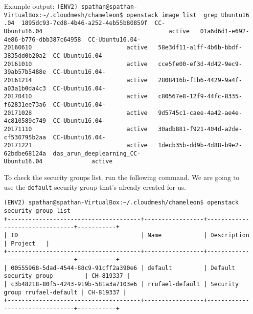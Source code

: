 Example output:
\texttt{(ENV2)\ spathan@spathan-VirtualBox:\textasciitilde{}/.cloudmesh/chameleon\$\ openstack\ image\ list\ \textbar{}\ grep\ \textquotesingle{}Ubuntu16.04\textquotesingle{}\ \textbar{}\ 1895dc93-7cd8-4b46-a252-4eb55b80859f\ \textbar{}\ CC-Ubuntu16.04\ \ \ \ \ \ \ \ \ \ \ \ \ \ \ \ \ \ \ \ \ \ \ \ \ \ \ \ \ \ \ \ \ \ \ \textbar{}\ active\ \textbar{}\ \textbar{}\ 01a6d6d1-e692-4e86-b776-dbb387c64958\ \textbar{}\ CC-Ubuntu16.04-20160610\ \ \ \ \ \ \ \ \ \ \ \ \ \ \ \ \ \ \ \ \ \ \ \ \ \ \textbar{}\ active\ \textbar{}\ \textbar{}\ 58e3df11-a1ff-4b6b-bbdf-3835dd0b20a2\ \textbar{}\ CC-Ubuntu16.04-20161010\ \ \ \ \ \ \ \ \ \ \ \ \ \ \ \ \ \ \ \ \ \ \ \ \ \ \textbar{}\ active\ \textbar{}\ \textbar{}\ cce5fe00-ef3d-4d42-9ec9-39ab57b5488e\ \textbar{}\ CC-Ubuntu16.04-20161214\ \ \ \ \ \ \ \ \ \ \ \ \ \ \ \ \ \ \ \ \ \ \ \ \ \ \textbar{}\ active\ \textbar{}\ \textbar{}\ 2808416b-f1b6-4429-9a4f-a03a1b0da4c3\ \textbar{}\ CC-Ubuntu16.04-20170410\ \ \ \ \ \ \ \ \ \ \ \ \ \ \ \ \ \ \ \ \ \ \ \ \ \ \textbar{}\ active\ \textbar{}\ \textbar{}\ c80567e8-12f9-44fc-8335-f62831ee73a6\ \textbar{}\ CC-Ubuntu16.04-20171028\ \ \ \ \ \ \ \ \ \ \ \ \ \ \ \ \ \ \ \ \ \ \ \ \ \ \textbar{}\ active\ \textbar{}\ \textbar{}\ 9d5745c1-caee-4a42-ae4e-4c810589c749\ \textbar{}\ CC-Ubuntu16.04-20171110\ \ \ \ \ \ \ \ \ \ \ \ \ \ \ \ \ \ \ \ \ \ \ \ \ \ \textbar{}\ active\ \textbar{}\ \textbar{}\ 30adb881-f921-404d-a2de-cf530795b2aa\ \textbar{}\ CC-Ubuntu16.04-20171221\ \ \ \ \ \ \ \ \ \ \ \ \ \ \ \ \ \ \ \ \ \ \ \ \ \ \textbar{}\ active\ \textbar{}\ \textbar{}\ 1decb35b-dd9b-4d88-b9e2-62bdbe68124a\ \textbar{}\ das\_arun\_deeplearning\_CC-Ubuntu16.04\ \ \ \ \ \ \ \ \ \ \ \ \ \textbar{}\ active\ \textbar{}}

To check the security groups list, run the following command. We are
going to use the \texttt{default} security group that's already created
for us.

\begin{lstlisting}
(ENV2) spathan@spathan-VirtualBox:~/.cloudmesh/chameleon$ openstack security group list
+--------------------------------------+-----------------+--------------------------------+-----------+
| ID                                   | Name            | Description                    | Project   |
+--------------------------------------+-----------------+--------------------------------+-----------+
| 00555968-5dad-4544-88c9-91cff2a390e6 | default         | Default security group         | CH-819337 |
| c3b48218-80f5-4243-919b-581a3a7103e6 | rrufael-default | Security group rrufael-default | CH-819337 |
+--------------------------------------+-----------------+--------------------------------+-----------+
\end{lstlisting}

